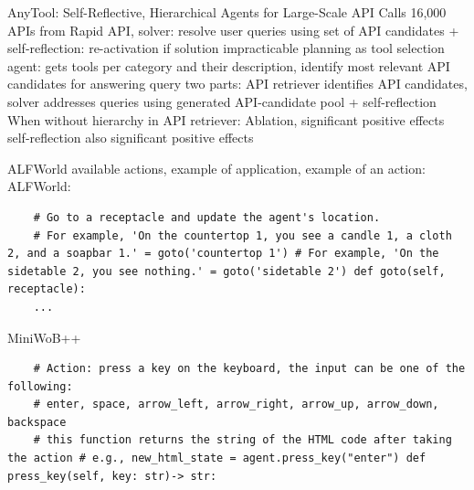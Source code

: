 \documentclass{article}
\begin{document}
\cite{du_anytool_2024} AnyTool: Self-Reflective, Hierarchical Agents for Large-Scale API Calls
16,000 APIs from Rapid API, solver: resolve user queries using set of API candidates + self-reflection: re-activation if solution impracticable
planning as tool selection
agent: gets tools per category and their description, identify most relevant API candidates for answering query
two parts: API retriever identifies API candidates, solver addresses queries using generated API-candidate pool + self-reflection
When without hierarchy in API retriever: Ablation, significant positive effects
self-reflection also significant positive effects

\cite{sun_adaplanner_2023-1} ALFWorld available actions, example of application, example of an action:
ALFWorld:
\begin{verbatim}
	# Go to a receptacle and update the agent's location. 
	# For example, 'On the countertop 1, you see a candle 1, a cloth 2, and a soapbar 1.' = goto('countertop 1') # For example, 'On the sidetable 2, you see nothing.' = goto('sidetable 2') def goto(self, receptacle): 
	...
\end{verbatim}
MiniWoB++
\begin{verbatim}
	# Action: press a key on the keyboard, the input can be one of the following: 
	# enter, space, arrow_left, arrow_right, arrow_up, arrow_down, backspace 
	# this function returns the string of the HTML code after taking the action # e.g., new_html_state = agent.press_key("enter") def press_key(self, key: str)-> str:
\end{verbatim}
\end{document}
